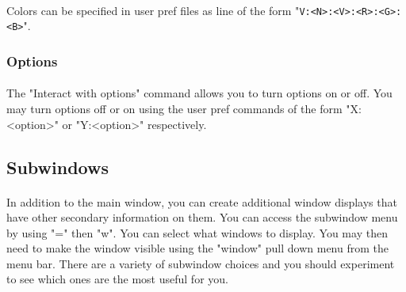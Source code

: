 \paragraph{}Colors can be specified in user pref files as line of the
form "\verb+V:<N>:<V>:<R>:<G>:<B>+".

\subsubsection{Options}
\paragraph{}The "Interact with options" command allows you to turn
options on or off. You may turn options off or on using the user pref
commands of the form "X:<option>" or "Y:<option>" respectively.


\subsection{Subwindows}
\paragraph{}In addition to the main window, you can create additional window
displays that have other secondary information on them. You can access the
subwindow menu by using "=" then "w". You can select what windows to
display. You may then need to make the window visible using the "window"
pull down menu from the menu bar. There are a variety of subwindow choices
and you should experiment to see which ones are the most useful for you.

